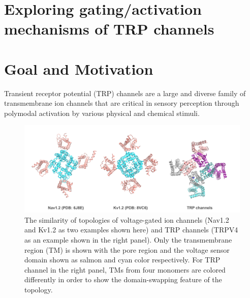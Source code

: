 \section{\textbf{Exploring gating/activation mechanisms of TRP channels}}

\section*{Goal and Motivation}
Transient receptor potential (TRP) channels are a large and diverse family of transmembrane ion channels that are critical in sensory perception through polymodal activation by various physical and chemical stimuli.

\begin{figure}[H]
    \centering
    \includegraphics[width=400pt]{topological_similarity.png}
    \caption{The similarity of topologies of voltage-gated ion channels (Nav1.2 and Kv1.2 as two examples shown here) and TRP channels (TRPV4 as an example shown in the right panel). Only the transmembrane region (TM) is shown with the pore region and the voltage sensor domain shown as salmon and cyan color respectively. For TRP channel in the right panel, TMs from four monomers are colored differently in order to show the domain-swapping feature of the topology.}
    \label{fig:topological similarity}
\end{figure}

\newpage